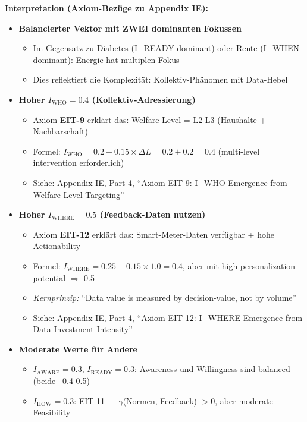 \textbf{Interpretation (Axiom-Bezüge zu Appendix IE):}
\begin{itemize}[nosep]
\item \textbf{Balancierter Vektor mit ZWEI dominanten Fokussen}
  \begin{itemize}[nosep]
  \item Im Gegensatz zu Diabetes (I_READY dominant) oder Rente (I_WHEN dominant): Energie hat multiplen Fokus
  \item Dies reflektiert die Komplexität: Kollektiv-Phänomen mit Data-Hebel
  \end{itemize}

\item \textbf{Hoher $I_{\text{WHO}} = 0.4$ (Kollektiv-Adressierung)}
  \begin{itemize}[nosep]
  \item Axiom \textbf{EIT-9} erklärt das: Welfare-Level = L2-L3 (Haushalte + Nachbarschaft)
  \item Formel: $I_{\text{WHO}} = 0.2 + 0.15 \times \Delta L = 0.2 + 0.2 = 0.4$ (multi-level intervention erforderlich)
  \item Siehe: Appendix IE, Part 4, ``Axiom EIT-9: I_WHO Emergence from Welfare Level Targeting''
  \end{itemize}

\item \textbf{Hoher $I_{\text{WHERE}} = 0.5$ (Feedback-Daten nutzen)}
  \begin{itemize}[nosep]
  \item Axiom \textbf{EIT-12} erklärt das: Smart-Meter-Daten verfügbar + hohe Actionability
  \item Formel: $I_{\text{WHERE}} = 0.25 + 0.15 \times 1.0 = 0.4$, aber mit high personalization potential $\Rightarrow$ 0.5
  \item \textit{Kernprinzip:} ``Data value is measured by decision-value, not by volume''
  \item Siehe: Appendix IE, Part 4, ``Axiom EIT-12: I_WHERE Emergence from Data Investment Intensity''
  \end{itemize}

\item \textbf{Moderate Werte für Andere}
  \begin{itemize}[nosep]
  \item $I_{\text{AWARE}} = 0.3$, $I_{\text{READY}} = 0.3$: Awareness und Willingness sind balanced (beide ~0.4-0.5)
  \item $I_{\text{HOW}} = 0.3$: EIT-11 --- $\gamma$(Normen, Feedback) $> 0$, aber moderate Feasibility
  \end{itemize}
\end{itemize}

